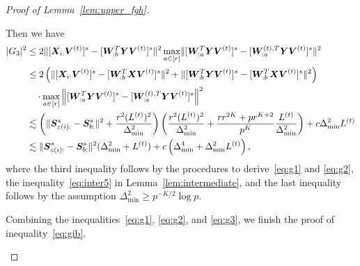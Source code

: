\documentclass[lettersize,onecolumn,journal]{IEEEtran}
\theoremstyle{definition}
\theoremstyle{definition}
\newcommand{\of}[1]{\left(#1\right)}
\begin{document}
\begin{proof}[Proof of Lemma~\ref{lem:upper_fgh}]
\begin{enumerate}
        
   Then we have 
    \begin{align}
        |G_3|^2 & \leq 2 \onormSize{}{[\mX_{i:} \mV^{(t)}]^s  -  [  \mW_{:b}^T \mY \mV^{(t)} ]^s}^2 \max_{a \in [r]} \onormSize{}{ [  \mW_{:a}^T \mY \mV^{(t)} ]^s -  [   \mW_{:a}^{(t),T} \mY \mV^{(t)}  ]^s}^2 \\
        & \leq 2 \of{ \onormSize{}{[\mX_{i:} \mV^{(t)}]^s  -  [  \mW_{:b}^T \mX \mV^{(t)} ]^s}^2  +  \onormSize{}{ [  \mW_{:b}^T \mY \mV^{(t)} ]^s  -  [  \mW_{:b}^T \mX \mV^{(t)} ]^s}^2  } \\
        & \quad \cdot \max_{a \in [r]} \onorm{ [  \mW_{:a}^T \mY \mV^{(t)} ]^s -  [   \mW_{:a}^{(t),T} \mY \mV^{(t)}  ]^s}^2\\
        & \lesssim \of{\onormSize{}{\mS_{z(i):}^s - \mS_{b:}^s}^2 + \frac{r^2 (L^{(t)})^2}{\Delta_{\min}^2} } \of{ \frac{r^2(L^{(t)})^2}{ \Delta_{\min}^2} + \frac{r r^{2K} + pr^{K+2}}{p^{K}} \frac{L^{(t)}}{\Delta_{\min}^2}}+ c \Delta_{\min}^2 L^{(t)} \\
        & \lesssim \onormSize{}{\mS_{z(i):}^s - \mS_{b:}^s}^2 (\Delta_{\min}^2 + L^{(t)}) + c\of{\Delta_{\min}^4 +  \Delta_{\min}^2 L^{(t)}},\label{eq:g3}
    \end{align}
    where the third inequality follows by the procedures to derive~\eqref{eq:g1} and \eqref{eq:g2}, the inequality~\eqref{eq:inter5} in Lemma~\ref{lem:intermediate}, and the last inequality follows by the assumption $\Delta_{\min}^2 \geq p^{-K/2} \log p$.
    
    Combining the inequalities~\eqref{eq:g1}, \eqref{eq:g2}, and \eqref{eq:g3}, we finish the proof of inequality~\eqref{eq:gib}.
    

\end{enumerate}
\end{proof}
\end{document}
